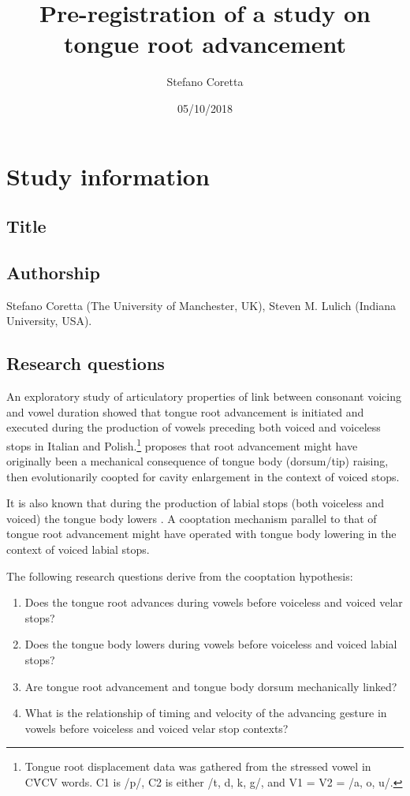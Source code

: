 \documentclass[11pt,]{article}
\title{Pre-registration of a study on tongue root advancement}
\author{Stefano Coretta}
\date{05/10/2018}
\providecommand{\tightlist}{%
  \setlength{\itemsep}{0pt}\setlength{\parskip}{0pt}}
\let\rmarkdownfootnote\footnote%
\def\footnote{\protect\rmarkdownfootnote}
\begin{document}
\maketitle

\section{Study information}\label{study-information}

\subsection{Title}\label{title}

\subsection{Authorship}\label{authorship}

Stefano Coretta (The University of Manchester, UK), Steven M. Lulich
(Indiana University, USA).

\subsection{Research questions}\label{research-questions}

An exploratory study of articulatory properties of link between
consonant voicing and vowel duration \citep{coretta2018f, coretta2018d}
showed that tongue root advancement is initiated and executed during the
production of vowels preceding both voiced and voiceless stops in
Italian and
Polish.\footnote{Tongue root displacement data was gathered from the stressed vowel in CV́CV words. C1 is /p/, C2 is either /t, d, k, g/, and V1 = V2 = /a, o, u/.}
\citet{coretta2018d} proposes that root advancement might have
originally been a mechanical consequence of tongue body (dorsum/tip)
raising, then evolutionarily coopted for cavity enlargement in the
context of voiced stops.

It is also known that during the production of labial stops (both
voiceless and voiced) the tongue body lowers
\citep{vazquez-alvarez2007}. A cooptation mechanism parallel to that of
tongue root advancement might have operated with tongue body lowering in
the context of voiced labial stops.

The following research questions derive from the cooptation hypothesis:

\begin{enumerate}
\def\labelenumi{\arabic{enumi}.}
\tightlist
\item
  Does the tongue root advances during vowels before voiceless and
  voiced velar stops?
\item
  Does the tongue body lowers during vowels before voiceless and voiced
  labial stops?
\item
  Are tongue root advancement and tongue body dorsum mechanically
  linked?
\item
  What is the relationship of timing and velocity of the advancing
  gesture in vowels before voiceless and voiced velar stop contexts?
\end{enumerate}
\end{document}
